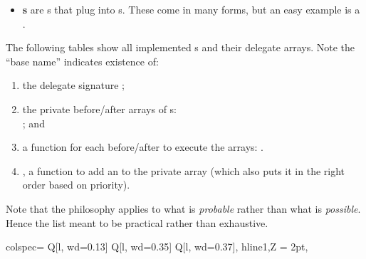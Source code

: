 \begin{itemize}
{\begin{center}
		\end{center}		 
		}
	\item{\textbf{s} are s that plug into s. These come in many forms, but an easy example is a . }
\end{itemize}


The following tables show all implemented s and their delegate arrays. Note the ``base name'' indicates existence of:

\begin{enumerate}
	\item{the delegate signature ;}
	\item{the private before/after arrays of s: \\; and}
	\item{a function for each before/after to execute the arrays: .}
	\item{, a function to add an  to the private array  (which also puts it in the right order based on priority).}
\end{enumerate}

\noindent Note that the philosophy applies to what is \textit{probable} rather than what is \textit{possible}. Hence the list meant to be practical rather than exhaustive.


\begin{longtblr}[
	caption = {Delegate Arrays for \code{LevelComponent}},
	label = {delegate-arrays-levelcomponent},
]{
	colspec= {Q[l, wd=0.13\linewidth] Q[l, wd=0.35\linewidth] Q[l, wd=0.37\linewidth]},
	hline{1,Z} = {2pt},
}
	
\end{longtblr}


\newcommand{\DelegateSpace}{\hspace*{1em}$\blacktriangleright$}
\newcommand{\DelegateNote}{\hspace*{2em}\textit{Note:}}

